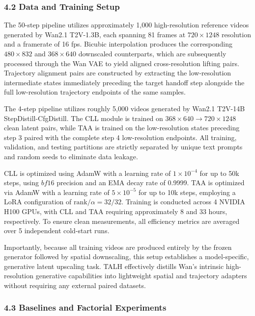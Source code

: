 \hypertarget{data-and-training-setup}{%
\subsubsection{4.2 Data and Training Setup}\label{data-and-training-setup}}

The 50-step pipeline utilizes approximately 1,000 high-resolution reference videos generated by Wan2.1 T2V-1.3B, each spanning 81 frames at \(720\times1248\) resolution and a framerate of 16 fps. Bicubic interpolation produces the corresponding \(480\times832\) and \(368\times640\) downscaled counterparts, which are subsequently processed through the Wan VAE to yield aligned cross-resolution lifting pairs. Trajectory alignment pairs are constructed by extracting the low-resolution intermediate states immediately preceding the target handoff step alongside the full low-resolution trajectory endpoints of the same samples.

The 4-step pipeline utilizes roughly 5,000 videos generated by Wan2.1 T2V-14B StepDistill-CfgDistill. The CLL module is trained on \(368\times640 \rightarrow 720\times1248\) clean latent pairs, while TAA is trained on the low-resolution states preceding step 3 paired with the complete step 4 low-resolution endpoints. All training, validation, and testing partitions are strictly separated by unique text prompts and random seeds to eliminate data leakage.

CLL is optimized using AdamW with a learning rate of \(1\times10^{-4}\) for up to 50k steps, using \(bf16\) precision and an EMA decay rate of 0.9999. TAA is optimized via AdamW with a learning rate of \(5\times10^{-5}\) for up to 10k steps, employing a LoRA configuration of \(\text{rank}/\alpha = 32/32\). Training is conducted across 4 NVIDIA H100 GPUs, with CLL and TAA requiring approximately 8 and 33 hours, respectively. To ensure clean measurements, all efficiency metrics are averaged over 5 independent cold-start runs.

Importantly, because all training videos are produced entirely by the frozen generator followed by spatial downscaling, this setup establishes a model-specific, generative latent upscaling task. TALH effectively distills Wan's intrinsic high-resolution generative capabilities into lightweight spatial and trajectory adapters without requiring any external paired datasets.

\hypertarget{baselines-and-factorial-experiments}{%
\subsubsection{4.3 Baselines and Factorial Experiments}\label{baselines-and-factorial-experiments}}

